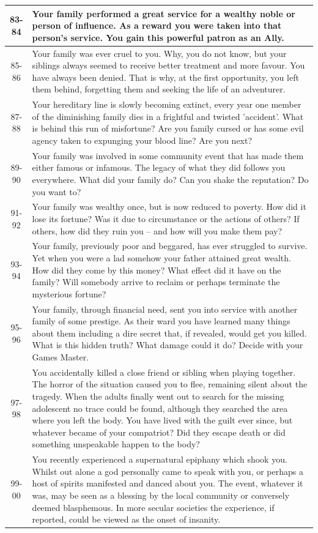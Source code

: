 \documentclass[10pt]{article}
\begin{document}
\begin{longtable}{|c|p{12cm}|}
\hline
83-84 & Your family performed a great service for a wealthy noble or person of influence. As a reward you were taken into that person's service. You gain this powerful patron as an Ally. \\
\hline
85-86 & Your family was ever cruel to you. Why, you do not know, but your siblings always seemed to receive better treatment and more favour. You have always been denied. That is why, at the first opportunity, you left them behind, forgetting them and seeking the life of an adventurer. \\
\hline
87-88 & Your hereditary line is slowly becoming extinct, every year one member of the diminishing family dies in a frightful and twisted 'accident'. What is behind this run of misfortune? Are you family cursed or has some evil agency taken to expunging your blood line? Are you next? \\
\hline
89-90 & Your family was involved in some community event that has made them either famous or infamous. The legacy of what they did follows you everywhere. What did your family do? Can you shake the reputation? Do you want to? \\
\hline
91-92 & Your family was wealthy once, but is now reduced to poverty. How did it lose its fortune? Was it due to circumstance or the actions of others? If others, how did they ruin you – and how will you make them pay? \\
\hline
93-94 & Your family, previously poor and beggared, has ever struggled to survive. Yet when you were a lad somehow your father attained great wealth. How did they come by this money? What effect did it have on the family? Will somebody arrive to reclaim or perhaps terminate the mysterious fortune? \\
\hline
95-96 & Your family, through financial need, sent you into service with another family of some prestige. As their ward you have learned many things about them including a dire secret that, if revealed, would get you killed. What is this hidden truth? What damage could it do? Decide with your Games Master. \\
\hline
97-98 & You accidentally killed a close friend or sibling when playing together. The horror of the situation caused you to flee, remaining silent about the tragedy. When the adults finally went out to search for the missing adolescent no trace could be found, although they searched the area where you left the body. You have lived with the guilt ever since, but whatever became of your compatriot? Did they escape death or did something unspeakable happen to the body? \\
\hline
99-00 & You recently experienced a supernatural epiphany which shook you. Whilst out alone a god personally came to speak with you, or perhaps a host of spirits manifested and danced about you. The event, whatever it was, may be seen as a blessing by the local community or conversely deemed blasphemous. In more secular societies the experience, if reported, could be viewed as the onset of insanity. \\
\hline
\end{longtable}
\end{document}
